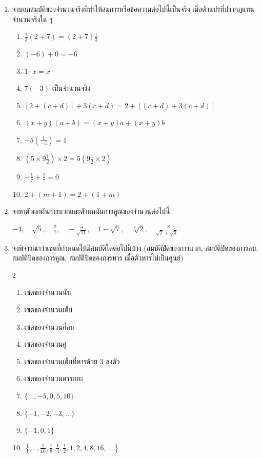 \begin{enumerate}[label=\arabic*., leftmargin=*, itemsep=2em]
	
	\item จงบอกสมบัติของจำนวนจริงที่ทำให้สมการหรือข้อความต่อไปนี้เป็นจริง เมื่อตัวแปรที่ปรากฏแทนจำนวนจริงใด ๆ
	\begin{enumerate}[label=\theenumi\arabic*), leftmargin=2em, itemsep=0.6em]
		\everymath{\displaystyle}
		\item $\frac{1}{3}(2+7) = (2+7)\frac{1}{3}$
		\item $(-6)+0 = -6$
		\item $1 \cdot x = x$
		\item $7(-3)$ เป็นจำนวนจริง
		\item $[2+(c+d)]+3(c+d) = 2+[(c+d)+3(c+d)]$
		\item $(x+y)(a+b) = (x+y)a + (x+y)b$
		\item $-5\left(\frac{1}{-5}\right) = 1$
		\item $\left(5 \times 9\frac{1}{2}\right) \times 2 = 5\left(9\frac{1}{2} \times 2\right)$
		\item $-\frac{1}{7} + \frac{1}{7} = 0$
		\item $2 + (m+1) = 2 + (1+m)$
	\end{enumerate}
	
	\item จงหาตัวผกผันการบวกและตัวผกผันการคูณของจำนวนต่อไปนี้
	\begin{center}
		\everymath{\displaystyle}
		$-4, \quad \sqrt{5}, \quad \frac{2}{7}, \quad -\frac{5}{\sqrt{11}}, \quad 1-\sqrt{7}, \quad \sqrt[3]{2}, \quad \frac{-8}{\sqrt{2}+\sqrt{3}}$
	\end{center}
	
	\item จงพิจารณาว่าเซตที่กำหนดให้มีสมบัติใดต่อไปนี้บ้าง (สมบัติปิดของการบวก, สมบัติปิดของการลบ, สมบัติปิดของการคูณ, สมบัติปิดของการหาร เมื่อตัวหารไม่เป็นศูนย์)
\begin{multicols}{2}
	\begin{enumerate}[label=\theenumi\arabic*), leftmargin=2em, itemsep=0.5em]
	\everymath{\displaystyle}
	\item เซตของจำนวนนับ 
	\item เซตของจำนวนเต็ม
	\item เซตของจำนวนคี่ลบ
	\item เซตของจำนวนคู่
	\item เซตของจำนวนเต็มที่หารด้วย $3$ ลงตัว
	\item เซตของจำนวนตรรกยะ 
	\item $\{\dots, -5, 0, 5, 10\}$
	\item $\{-1, -2, -3, \dots\}$
	\item $\{-1, 0, 1\}$
	\item $\left\{\dots, \frac{1}{16}, \frac{1}{8}, \frac{1}{4}, \frac{1}{2}, 1, 2, 4, 8, 16, \dots\right\}$
\end{enumerate}
\end{multicols}
\end{enumerate}

